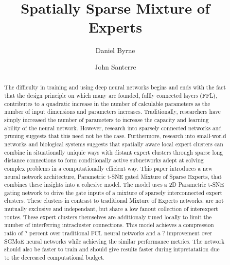 \documentclass{llncs}
\title{Spatially Sparse Mixture of Experts}
\author{
 Daniel Byrne\inst{1} \and
 John Santerre\inst{1}
}
\institute{
Master of Science in Data Science, Southern Methodist University,
Dallas TX 75275 USA
\email{\{byrned,santeerej\}@smu.edu}
}
\begin{document}
\maketitle              %

\setcounter{footnote}{0}
\begin{abstract}

The difficulty in training and using deep neural networks begins and ends with the fact that the design principle on which many are founded, fullly connected layers (FFL), contributes to a quadratic increase in the number of calculable parameters as the number of input dimensions and parameters increases. Traditionally, researchers have simply increased the number of parameters to increase the capacity and learning ability of the neural network. However, research into sparsely connected networks and pruning suggests that this need not be the case.  Furthermore, research into small-world networks and biological systems suggests that spatially aware local expert clusters can combine in situationally uniquie ways with distant expert clusters through sparse long distance connections to form conditionally active subnetworks adept at solving complex problems in a computationally efficient way. This paper introduces a new neural network architecture, Parametric t-SNE gated Mixture of Sparse Experts, that combines these insights into a cohesive model.  The model uses a 2D Parametric t-SNE gating network to drive the gate inputs of a mixture of sparsely interconnected expert clusters. These clusters in contrast to traditional Mixture of Experts networks, are not mutually exclusive and independant, but share a low fanout collection of interexpert routes.  These expert clusters themselves are additionaly tuned locally to limit the number of interferring intracluster connections. This model achieves a compression ratio of  ? percent over traditional FCL neural networks and a ? improvement over SGMoE neural networks while achieving the similar performance metrics.  The network should also be faster to train and should give results faster during intpretatation due to the decreased computational budget.

\end{abstract}

\end{document}
